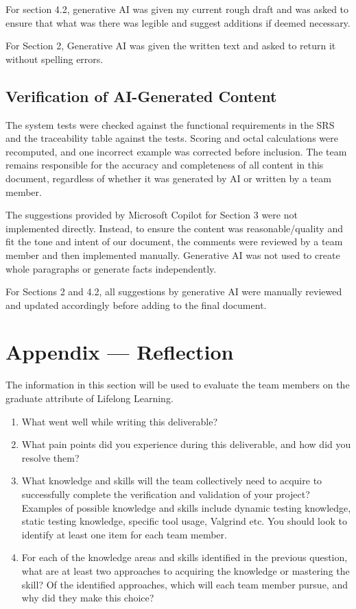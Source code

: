 \documentclass[12pt, titlepage]{article}
\renewcommand{\wss}[1]{}
\begin{document}
For section 4.2, generative AI was given my current rough draft and was asked to ensure that what was there was legible and suggest additions if deemed necessary.

For Section 2, Generative AI was given the written text and asked to return it without spelling errors.

\subsection{Verification of AI-Generated Content}

The system tests were checked against the functional requirements in the SRS and the traceability table against the tests. Scoring and octal calculations were recomputed, and one incorrect example was corrected before inclusion. The team remains responsible for the accuracy and completeness of all content in this document, regardless of whether it was generated by AI or written by a team member.

The suggestions provided by Microsoft Copilot for Section 3 were not implemented directly. Instead, to ensure the content was reasonable/quality and fit the tone and intent of our document, the comments were reviewed by a team member and then implemented manually. Generative AI was not used to create whole paragraphs or generate facts independently.

For Sections 2 and 4.2, all suggestions by generative AI were manually reviewed and updated accordingly before adding to the final document.

\newpage{}

\section{Appendix --- Reflection}

\wss{This section is not required for CAS 741}

The information in this section will be used to evaluate the team members on the
graduate attribute of Lifelong Learning.



\begin{enumerate}
  \item What went well while writing this deliverable? 
  \item What pain points did you experience during this deliverable, and how
    did you resolve them?
  \item What knowledge and skills will the team collectively need to acquire to
  successfully complete the verification and validation of your project?
  Examples of possible knowledge and skills include dynamic testing knowledge,
  static testing knowledge, specific tool usage, Valgrind etc.  You should look to
  identify at least one item for each team member.
  \item For each of the knowledge areas and skills identified in the previous
  question, what are at least two approaches to acquiring the knowledge or
  mastering the skill?  Of the identified approaches, which will each team
  member pursue, and why did they make this choice?
\end{enumerate}
\end{document}
